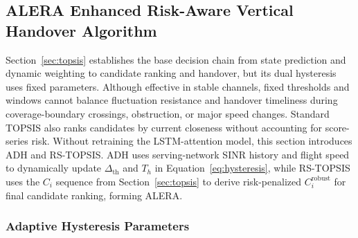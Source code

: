 \documentclass[final,3p,times,twocolumn]{elsarticle}
\begin{document}
\subsection{ALERA Enhanced Risk-Aware Vertical Handover Algorithm}\label{sec:alera}

Section~\ref{sec:topsis} establishes the base decision chain from state prediction and dynamic weighting to candidate ranking and handover, but its dual hysteresis uses fixed parameters. Although effective in stable channels, fixed thresholds and windows cannot balance fluctuation resistance and handover timeliness during coverage-boundary crossings, obstruction, or major speed changes. Standard TOPSIS also ranks candidates by current closeness without accounting for score-series risk. Without retraining the LSTM-attention model, this section introduces ADH and RS-TOPSIS. ADH uses serving-network SINR history and flight speed to dynamically update $\Delta_{\mathrm{th}}$ and $T_h$ in Equation~\eqref{eq:hysteresis}, while RS-TOPSIS uses the $C_i$ sequence from Section~\ref{sec:topsis} to derive risk-penalized $C_i^{\mathrm{robust}}$ for final candidate ranking, forming ALERA.

\subsubsection{Adaptive Hysteresis Parameters}\label{sec:adh}
\end{document}
